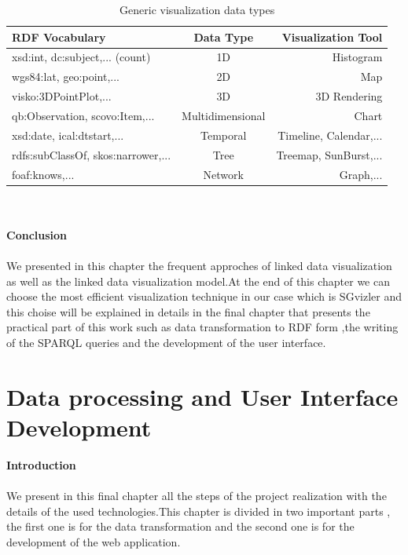 \documentclass[a4paper,12pt,oneside]{report}
\begin{document}
{{{\begin{table}
\begin{center}
\begin{tabular}{|l|c|r|}
\hline
RDF Vocabulary & Data Type & Visualization Tool\\
\hline
xsd:int, dc:subject,... (count)  & 1D & Histogram \\
\hline
wgs84:lat, geo:point,...& 2D & Map\\
\hline
visko:3DPointPlot,...& 3D & 3D Rendering\\
\hline
qb:Observation, scovo:Item,...&Multidimensional&Chart\\
\hline
xsd:date, ical:dtstart,...&Temporal&Timeline, Calendar,...\\
\hline
rdfs:subClassOf, skos:narrower,...&Tree&Treemap, SunBurst,...\\
\hline
foaf:knows,...&Network&Graph,...\\
\hline
\end{tabular}
\end{center}
\caption{Generic visualization data types}
\end{table}
 }\\ \\
\textbf{\large Conclusion}\\ \\
{We presented in this chapter the frequent approches of linked data visualization as well as the linked data visualization model.At the end of this chapter we can choose the most efficient visualization technique in our case which is SGvizler and this choise will be explained in details in the final chapter that presents the practical part of this work such as data transformation to RDF form ,the  writing of the SPARQL queries and the development of the user interface.}
\chapter {Data processing and User Interface Development }
\textbf{\large Introduction }\\ \\
{We present in this final chapter all the steps of the project realization with the details of the used technologies.This chapter is divided in two important parts , the first one is for the data transformation and the second one is for the development of the web application.}
}}
\end{document}
